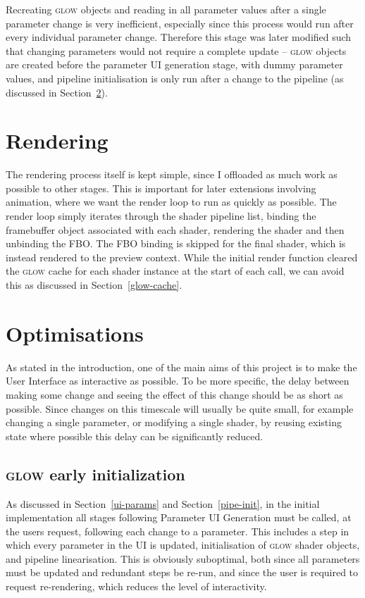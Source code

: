 \documentclass[12pt,twoside,notitlepage]{report}
\begin{document}
Recreating \textsc{glow} objects and reading in all parameter values after a single parameter change is very inefficient, especially since this process would run after every individual parameter change. Therefore this stage was later modified such that changing parameters would not require a complete update -- \textsc{glow} objects are created before the parameter UI generation stage, with dummy parameter values, and pipeline initialisation is only run after a change to the pipeline (as discussed in Section~\ref{opt}).

\section{Rendering}
The rendering process itself is kept simple, since I offloaded as much work as possible to other stages. This is important for later extensions involving animation, where we want the render loop to run as quickly as possible. The render loop simply iterates through the shader pipeline list, binding the framebuffer object associated with each shader, rendering the shader and then unbinding the FBO. The FBO binding is skipped for the final shader, which is instead rendered to the preview context. While the initial render function cleared the \textsc{glow} cache for each shader instance at the start of each call, we can avoid this as discussed in Section~\ref{glow-cache}.

\clearpage
\section{Optimisations}
\label{opt}
As stated in the introduction, one of the main aims of this project is to make the User Interface as interactive as possible. To be more specific, the delay between making some change and seeing the effect of this change should be as short as possible. Since changes on this timescale will usually be quite small, for example changing a single parameter, or modifying a single shader, by reusing existing state where possible this delay can be significantly reduced.

\subsection{\textsc{glow} early initialization}
As discussed in Section~\ref{ui-params} and Section~\ref{pipe-init}, in the initial implementation all stages following Parameter UI Generation must be called, at the users request, following each change to a parameter. This includes a step in which every parameter in the UI is updated, initialisation of \textsc{glow} shader objects, and pipeline linearisation. This is obviously suboptimal, both since all parameters must be updated and redundant steps be re-run, and since the user is required to request re-rendering, which reduces the level of interactivity.
\end{document}

